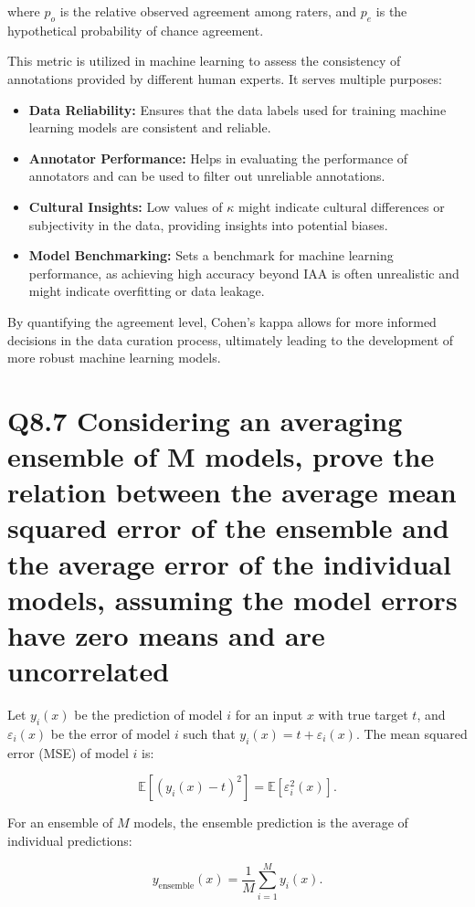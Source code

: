 \documentclass[11pt]{article}
\begin{document}
where \( p_o \) is the relative observed agreement among raters, and \( p_e \) is the hypothetical probability of chance agreement. 

This metric is utilized in machine learning to assess the consistency of annotations provided by different human experts. It serves multiple purposes:

\begin{itemize}
  \item \textbf{Data Reliability:} Ensures that the data labels used for training machine learning models are consistent and reliable.
  \item \textbf{Annotator Performance:} Helps in evaluating the performance of annotators and can be used to filter out unreliable annotations.
  \item \textbf{Cultural Insights:} Low values of \(\kappa\) might indicate cultural differences or subjectivity in the data, providing insights into potential biases.
  \item \textbf{Model Benchmarking:} Sets a benchmark for machine learning performance, as achieving high accuracy beyond IAA is often unrealistic and might indicate overfitting or data leakage.
\end{itemize}

By quantifying the agreement level, Cohen's kappa allows for more informed decisions in the data curation process, ultimately leading to the development of more robust machine learning models.

\section{Q8.7 Considering an averaging ensemble of M models, prove the relation between the average mean squared error of the ensemble and the average error of the individual models, assuming the model errors have zero means and are uncorrelated}

Let \( y_i(x) \) be the prediction of model \( i \) for an input \( x \) with true target \( t \), and \( \varepsilon_i(x) \) be the error of model \( i \) such that \( y_i(x) = t + \varepsilon_i(x) \). The mean squared error (MSE) of model \( i \) is:

\[
\mathbb{E}\left[\left(y_i(x) - t\right)^2\right] = \mathbb{E}\left[\varepsilon_i^2(x)\right].
\]

For an ensemble of \( M \) models, the ensemble prediction is the average of individual predictions:

\[
y_{\text{ensemble}}(x) = \frac{1}{M} \sum_{i=1}^{M} y_i(x).
\]
\end{document}
